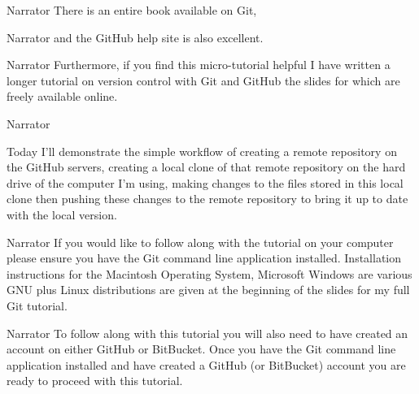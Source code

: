 \documentclass{screenplay} %
\begin{document}
\begin{dialogue}{Narrator} 
There is an entire book available on Git,
\end{dialogue}

\begin{dialogue}{Narrator} 
and the GitHub help site is also excellent.
\end{dialogue}

\begin{dialogue}{Narrator} 
Furthermore, if you find this micro-tutorial helpful I have written a longer tutorial on version control with Git and GitHub the slides for which are freely available online.
\end{dialogue}

\begin{dialogue}{Narrator} 

Today I'll demonstrate the simple workflow of creating a remote repository on the GitHub servers, creating a local clone of that remote repository on the hard drive of the computer I'm using, making changes to the files stored in this local clone then pushing these changes to the remote repository to bring it up to date with the local version.
\end{dialogue}

\begin{dialogue}{Narrator} If you would like to follow along with the tutorial on your computer please ensure you have the Git command line application installed.  Installation instructions for the Macintosh Operating System, Microsoft Windows are various GNU plus Linux distributions are given at the beginning of the slides for my full Git tutorial.
\end{dialogue} 

\begin{dialogue}{Narrator}
To follow along with this tutorial you will also need to have created an account on either GitHub or BitBucket.  Once you have the Git command line application installed and have created a GitHub (or BitBucket) account you are ready to proceed with this tutorial.
\end{dialogue}
\end{document}
